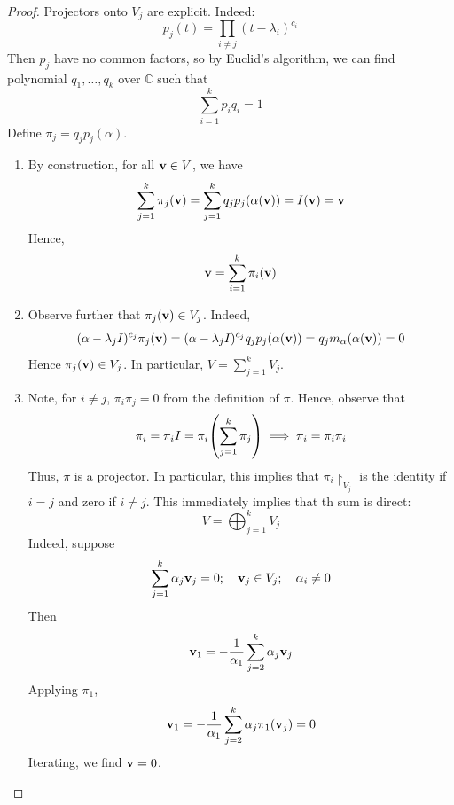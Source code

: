\documentclass[a4paper,11pt]{article}
\begin{document}
\begin{proof}
	Projectors onto $V_j$ are explicit. Indeed: 
	\[
		p_j(t) = \prod_{i\neq j} (t-\lambda_i)^{c_i}
	\]
	Then $p_j$ have no common factors, so by Euclid's algorithm, we can find polynomial $ q_1,\dots,q_k $ over $\mathbb{C}$ such that
	\[
		\sum_{i=1}^{k}p_i q_i = 1
	\]
	Define $ \pi_j = q_j p_j (\alpha) $. 
	\begin{enumerate}
		\item By construction, for all \( {\bf v} \in V \), we have
		\[
			\sum_{j=1}^k \pi_j({\bf v}) = \sum_{j=1}^k q_j p_j(\alpha({\bf v})) = I({\bf v}) = {\bf v}
		\]
		Hence,
		\[
			{\bf v} = \sum_{i=1}^k \pi_i({\bf v})
		\]
		\item Observe further that \( \pi_j({\bf v}) \in V_j \).
		Indeed,
		\[
			(\alpha - \lambda_j I)^{c_j} \pi_j({\bf v}) = (\alpha - \lambda_j I)^{c_j} q_j p_j(\alpha({\bf v})) = q_j m_\alpha (\alpha({\bf v})) = 0
		\]
		Hence \( \pi_j({\bf v}) \in V_j \).
		In particular, \( V = \sum_{j=1}^k V_j \).
		\item Note, for \( i \neq j \), \( \pi_i \pi_j = 0 \) from the definition of \( \pi \).
		Hence, observe that
		\[
			\pi_i = \pi_i I =  \pi_i \qty(\sum_{j=1}^k \pi_j) \implies \pi_i = \pi_i \pi_i
		\]
		Thus, \( \pi \) is a projector.
		In particular, this implies that \( {\pi_i}\restriction_{V_j} \) is the identity if \( i = j \) and zero if \( i \neq j \).
		This immediately implies that th sum is direct:
		\[
			V = \bigoplus_{j=1}^k V_j
		\]
		Indeed, suppose
		\[
			\sum_{j=1}^k \alpha_j {\bf v}_j = 0;\quad {\bf v}_j \in V_j;\quad \alpha_i \neq 0
		\]
		Then
		\[
			{\bf v}_1 = -\frac{1}{\alpha_1} \sum_{j=2}^k \alpha_j {\bf v}_j
		\]
		Applying \( \pi_1 \),
		\[
			{\bf v}_1 = -\frac{1}{\alpha_1} \sum_{j=2}^k \alpha_j \pi_1({\bf v}_j) = 0
		\]
		Iterating, we find \( {\bf v} = 0 \).\qedhere
	\end{enumerate}
\end{proof}
\end{document}
